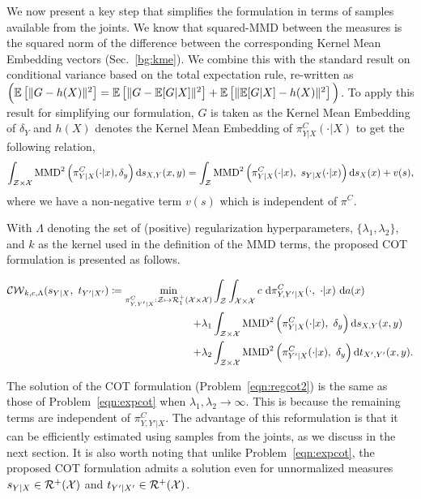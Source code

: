 We now present a key step that simplifies the formulation in terms of samples available from the joints. We know that squared-MMD between the measures is the squared norm of the difference between the corresponding Kernel Mean Embedding vectors (Sec.~\ref{bg:kme}). 
We combine this with the standard result on conditional variance based on the total expectation rule, re-written as $\Big(\mathbb{E}\left[\|G-h(X)\|^2\right]= \mathbb{E}\left[\|G-\mathbb{E}[G|X]\|^2\right] + \mathbb{E}\left[\|\mathbb{E}[G|X] - h(X)\|^2\right]\Big)$. To apply this result for simplifying our formulation, $G$ is taken as the Kernel Mean Embedding of $\delta_Y$ and $h(X)$ denotes the Kernel Mean Embedding of $\pi^C_{Y|X}(\cdot|X)$ to get the following relation, $$\int_{\mathcal{Z}\times\mathcal{X}}\textup{MMD}^2\left(\pi^C_{Y|X}(\cdot|x), \delta_y\right)\textup{d}s_{X, Y}(x,y)= \int_{\mathcal{Z}}\textup{MMD}^2\left(\pi^C_{Y|X}(\cdot|x), ~s_{Y|X}(\cdot|x)\right)\textup{d}s_X(x)+v(s),$$
where we have a non-negative term $v(s)$ which is independent of $\pi^C$.


With $\Lambda$ denoting the set of (positive) regularization hyperparameters, $\{\lambda_1, \lambda_2\}$, and $k$ as the kernel used in the definition of the MMD terms, the proposed COT formulation is presented as follows.
\begin{definitionBox}
\vspace{-0.15in}
\begin{align}\label{eqn:regcot2}
\calCW(s_{Y|X},\ t_{Y'|X'}) \coloneqq \min_{\pi^C_{Y, Y'|X}:\calZ\mapsto\mathcal{R}_1^+(\calX\times\calX)}&\int_{\calZ}\int_{\calX\times\calX} c\ \textup{d}\pi^C_{Y, Y'|X}(\cdot,\ \cdot|x)\ \textup{d}a(x) \nonumber\\
+\lambda_1&\int_{\calZ\times\calX}\MMD^2\left(\pi^C_{Y|X}(\cdot|x), \ \delta_y\right)\textup{d}s_{X, Y}(x,y)\nonumber\\
+\lambda_2&\int_{\calZ\times\calX}\MMD^2\left(\pi^C_{Y'|X}(\cdot|x),\ \delta_y\right)\textup{d}t_{X', Y'}(x,y).
\end{align}
\vspace{-0.25in}
\end{definitionBox}

The solution of the COT formulation (Problem~\ref{eqn:regcot2}) is the same as those of Problem~\ref{eqn:expcot} when $\lambda_1,\lambda_2\rightarrow\infty$. This is because the remaining terms are independent of $\pi^C_{Y, Y'|X}$. The advantage of this reformulation is that it can be efficiently estimated using samples from the joints, as we discuss in the next section. It is also worth noting that unlike Problem~\ref{eqn:expcot}, the proposed COT formulation admits a solution even for unnormalized measures $s_{Y|X}\in \mathcal{R}^+(\mathcal{X})$ and $t_{Y'|X'}\in \mathcal{R}^+(\mathcal{X})$.

